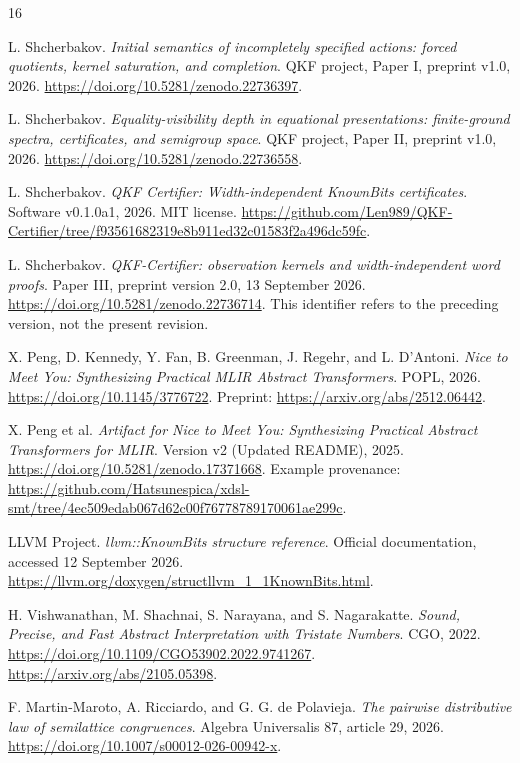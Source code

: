 \begin{thebibliography}{16}

L. Shcherbakov.
\emph{Initial semantics of incompletely specified actions: forced quotients, kernel saturation, and completion}.
QKF project, Paper I, preprint v1.0, 2026.
\url{https://doi.org/10.5281/zenodo.22736397}.

L. Shcherbakov.
\emph{Equality-visibility depth in equational presentations: finite-ground spectra, certificates, and semigroup space}.
QKF project, Paper II, preprint v1.0, 2026.
\url{https://doi.org/10.5281/zenodo.22736558}.

L. Shcherbakov.
\emph{QKF Certifier: Width-independent KnownBits certificates}.
Software v0.1.0a1, 2026. MIT license.
\url{https://github.com/Len989/QKF-Certifier/tree/f93561682319e8b911ed32c01583f2a496dc59fc}.

L. Shcherbakov.
\emph{QKF-Certifier: observation kernels and width-independent word proofs}.
Paper III, preprint version 2.0, 13 September 2026.
\url{https://doi.org/10.5281/zenodo.22736714}.
This identifier refers to the preceding version, not the present revision.

X. Peng, D. Kennedy, Y. Fan, B. Greenman, J. Regehr, and L. D'Antoni.
\emph{Nice to Meet You: Synthesizing Practical MLIR Abstract Transformers}.
POPL, 2026. \url{https://doi.org/10.1145/3776722}.
Preprint: \url{https://arxiv.org/abs/2512.06442}.

X. Peng et al.
\emph{Artifact for Nice to Meet You: Synthesizing Practical Abstract Transformers for MLIR}.
Version v2 (Updated README), 2025.
\url{https://doi.org/10.5281/zenodo.17371668}.
Example provenance: \url{https://github.com/Hatsunespica/xdsl-smt/tree/4ec509edab067d62c00f76778789170061ae299c}.

LLVM Project.
\emph{llvm::KnownBits structure reference}.
Official documentation, accessed 12 September 2026.
\url{https://llvm.org/doxygen/structllvm_1_1KnownBits.html}.

H. Vishwanathan, M. Shachnai, S. Narayana, and S. Nagarakatte.
\emph{Sound, Precise, and Fast Abstract Interpretation with Tristate Numbers}.
CGO, 2022. \url{https://doi.org/10.1109/CGO53902.2022.9741267}.
\url{https://arxiv.org/abs/2105.05398}.

F. Martin-Maroto, A. Ricciardo, and G. G. de Polavieja.
\emph{The pairwise distributive law of semilattice congruences}.
Algebra Universalis 87, article 29, 2026.
\url{https://doi.org/10.1007/s00012-026-00942-x}.


\end{thebibliography}
